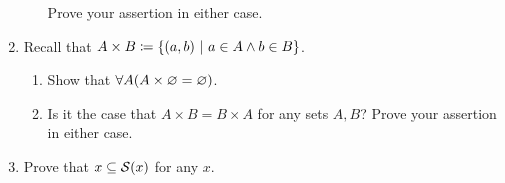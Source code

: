 \begin{enumerate}
\begin{enumerate}
                Prove your assertion in either case.
        \end{enumerate}
    \item
        Recall that \(A \times B \defn \set*{(a, b) \suchthat a \in A \meet b \in B}\).
        \begin{enumerate}
            \item
                Show that \(\forall A \pn*{A \times \emptyset = \emptyset}\).
            \item
                Is it the case that \(A \times B = B \times A\) for any sets \(A, B\)?
                Prove your assertion in either case.
        \end{enumerate}
    \item
        Prove that \(x \subseteq \successor{x}\) for any \(x\).
\end{enumerate}


